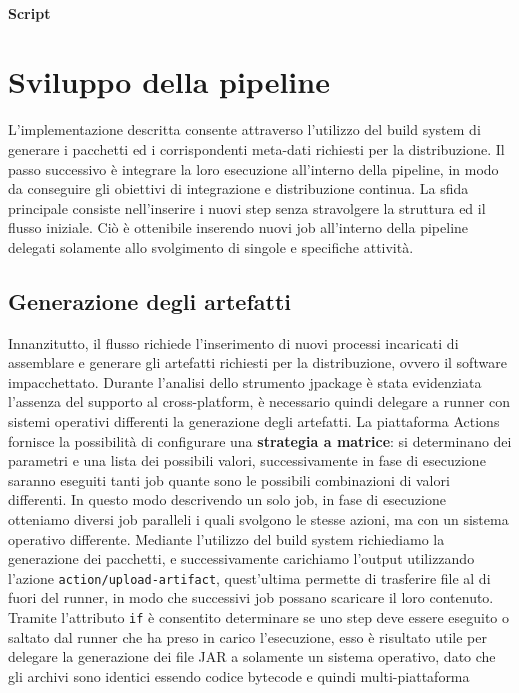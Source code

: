 \paragraph{Script}

\section{Sviluppo della pipeline}

L'implementazione descritta consente attraverso l'utilizzo del build system di generare i pacchetti ed i corrispondenti meta-dati richiesti per la distribuzione. Il passo successivo è integrare la loro esecuzione all'interno della pipeline, in modo da conseguire gli obiettivi di integrazione e distribuzione continua. La sfida principale consiste nell'inserire i nuovi step senza stravolgere la struttura ed il flusso iniziale. Ciò è ottenibile inserendo nuovi job all'interno della pipeline delegati solamente allo svolgimento di singole e specifiche attività.

\subsection{Generazione degli artefatti}

Innanzitutto, il flusso richiede l'inserimento di nuovi processi incaricati di assemblare e generare gli artefatti richiesti per la distribuzione, ovvero il software impacchettato. Durante l'analisi dello strumento jpackage è stata evidenziata l'assenza del supporto al cross-platform, è necessario quindi delegare a runner con sistemi operativi differenti la generazione degli artefatti. La piattaforma Actions fornisce la possibilità di configurare una \textbf{strategia a matrice}: si determinano dei parametri e una lista dei possibili valori, successivamente in fase di esecuzione saranno eseguiti tanti job quante sono le possibili combinazioni di valori differenti. In questo modo descrivendo un solo job, in fase di esecuzione otteniamo diversi job paralleli i quali svolgono le stesse azioni, ma con un sistema operativo differente. Mediante l'utilizzo del build system richiediamo la generazione dei pacchetti, e successivamente carichiamo l'output utilizzando l'azione \texttt{action/upload-artifact}, quest'ultima permette di trasferire file al di fuori del runner, in modo che successivi job possano scaricare il loro contenuto. Tramite l'attributo \texttt{if} è consentito determinare se uno step deve essere eseguito o saltato dal runner che ha preso in carico l'esecuzione, esso è risultato utile per delegare la generazione dei file JAR a solamente un sistema operativo, dato che gli archivi sono identici essendo codice bytecode e quindi multi-piattaforma

